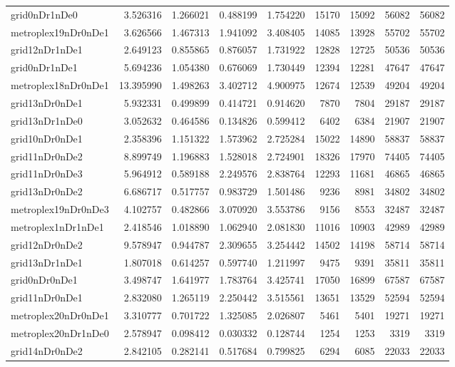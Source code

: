 \begin{longtable}{|l|r|r|r|r|r|r|r|r|}
grid0nDr1nDe0 & 3.526316 & 1.266021 & 0.488199 & 1.754220 & 15170 & 15092 & 56082 & 56082 \\
metroplex19nDr0nDe1 & 3.626566 & 1.467313 & 1.941092 & 3.408405 & 14085 & 13928 & 55702 & 55702 \\
grid12nDr1nDe1 & 2.649123 & 0.855865 & 0.876057 & 1.731922 & 12828 & 12725 & 50536 & 50536 \\
grid0nDr1nDe1 & 5.694236 & 1.054380 & 0.676069 & 1.730449 & 12394 & 12281 & 47647 & 47647 \\
metroplex18nDr0nDe1 & 13.395990 & 1.498263 & 3.402712 & 4.900975 & 12674 & 12539 & 49204 & 49204 \\
grid13nDr0nDe1 & 5.932331 & 0.499899 & 0.414721 & 0.914620 & 7870 & 7804 & 29187 & 29187 \\
grid13nDr1nDe0 & 3.052632 & 0.464586 & 0.134826 & 0.599412 & 6402 & 6384 & 21907 & 21907 \\
grid10nDr0nDe1 & 2.358396 & 1.151322 & 1.573962 & 2.725284 & 15022 & 14890 & 58837 & 58837 \\
grid11nDr0nDe2 & 8.899749 & 1.196883 & 1.528018 & 2.724901 & 18326 & 17970 & 74405 & 74405 \\
grid11nDr0nDe3 & 5.964912 & 0.589188 & 2.249576 & 2.838764 & 12293 & 11681 & 46865 & 46865 \\
grid13nDr0nDe2 & 6.686717 & 0.517757 & 0.983729 & 1.501486 & 9236 & 8981 & 34802 & 34802 \\
metroplex19nDr0nDe3 & 4.102757 & 0.482866 & 3.070920 & 3.553786 & 9156 & 8553 & 32487 & 32487 \\
metroplex1nDr1nDe1 & 2.418546 & 1.018890 & 1.062940 & 2.081830 & 11016 & 10903 & 42989 & 42989 \\
grid12nDr0nDe2 & 9.578947 & 0.944787 & 2.309655 & 3.254442 & 14502 & 14198 & 58714 & 58714 \\
grid13nDr1nDe1 & 1.807018 & 0.614257 & 0.597740 & 1.211997 & 9475 & 9391 & 35811 & 35811 \\
grid0nDr0nDe1 & 3.498747 & 1.641977 & 1.783764 & 3.425741 & 17050 & 16899 & 67587 & 67587 \\
grid11nDr0nDe1 & 2.832080 & 1.265119 & 2.250442 & 3.515561 & 13651 & 13529 & 52594 & 52594 \\
metroplex20nDr0nDe1 & 3.310777 & 0.701722 & 1.325085 & 2.026807 & 5461 & 5401 & 19271 & 19271 \\
metroplex20nDr1nDe0 & 2.578947 & 0.098412 & 0.030332 & 0.128744 & 1254 & 1253 & 3319 & 3319 \\
grid14nDr0nDe2 & 2.842105 & 0.282141 & 0.517684 & 0.799825 & 6294 & 6085 & 22033 & 22033 \\

\end{longtable}
